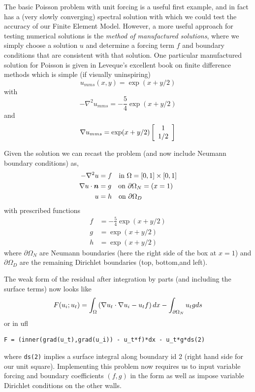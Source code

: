 The basic Poisson problem with unit forcing is a useful first example,
and in fact has a (very slowly converging) spectral solution with
which we could test the accuracy of our Finite Element Model.
However, a more useful approach for testing numerical solutions is the
\emph{method of manufactured solutions}, where we simply choose a
solution $u$ and determine a forcing term $f$ and boundary conditions
that are consistent with that solution.  One particular manufactured
solution for Poisson is given in Leveque's excellent book on finite
difference methods \cite{leveque_finite_2007} which is simple (if
visually uninspiring)
\begin{equation}
  \label{eq:13}
  u_{mms}(x,y) = \exp(x + y/2)
\end{equation}
with
\begin{equation}
  \label{eq:14}
  -\nabla^{2} u_{mms} = -\frac{5}{4}\exp(x+y/2)
\end{equation}
and
\begin{equation}
  \label{eq:15}
  \nabla u_{mms} = \exp(x+y/2)
  \left[
    \begin{array}{c}
 1 \\
1/2\\
\end{array}
  \right]
\end{equation}

Given the solution we can recast the problem (and now include  Neumann boundary conditions) as,
\begin{align}
  \label{eq:16}
-\nabla^2u &= f \quad\text{in } \Omega=[0,1]\times[0,1] \nonumber\\
\nabla u\cdot{\mbox{\boldmath$n$}} & = g \quad\text{on } \partial\Omega_{N}=(x=1)\\
 u &= h \quad\text{on } \partial\Omega_{D}\nonumber
\end{align}
with  prescribed functions
\begin{align}
  \label{eq:17}
  f &= -\frac{5}{4}\exp(x+y/2)\nonumber\\
  g & = \exp(x+y/2)\\
  h &=  \exp(x+y/2)\nonumber
\end{align}
where $\partial\Omega_{N}$ are Neumann boundaries (here the right side
of the box at $x=1$) and $\partial\Omega_{D}$ are the remaining Dirichlet boundaries (top, bottom,and left).

The weak form of the residual after integration by parts (and
including the surface terms) now looks like
\begin{equation}
  \label{eq:4}
  F(u_{i};u_{t}) = \int_{\Omega}
  \left(
    \nabla u_{t}\cdot\nabla u_{i} - u_{t}f
  \right)dx - \int_{\partial\Omega_{N}} u_{t}g ds
\end{equation}
or in ufl
\begin{lstlisting}[style=ufl]
F = (inner(grad(u_t),grad(u_i)) - u_t*f)*dx - u_t*g*ds(2)
\end{lstlisting}
where \texttt{ds(2)} implies a surface integral along boundary id 2
(right hand side for our unit square). Implementing this problem now
requires us to input variable forcing and boundary coefficients
$(f,g)$ in the form as well as impose variable Dirichlet conditions on
the other walls.

